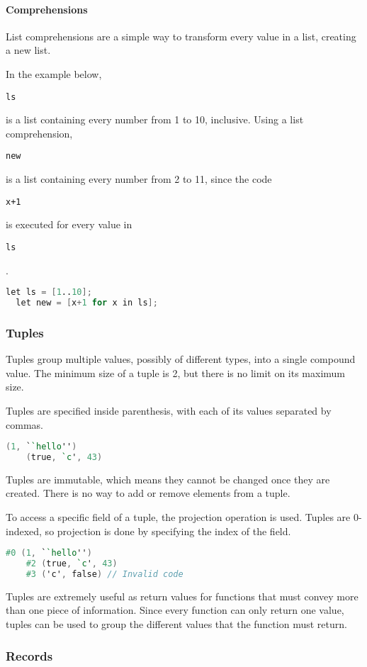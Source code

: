 \documentclass{article}
\def\code#1{\begin{footnotesize}\texttt{#1}\end{footnotesize}}
\begin{document}
\paragraph{Comprehensions}
List comprehensions are a simple way to transform every value in a list, creating a new list.

In the example below, \code{ls} is a list containing every number from 1 to 10, inclusive.
Using a list comprehension, \code{new} is a list containing every number from 2 to 11, since the code \code{x+1} is executed for every value in \code{ls}.

\begin{lstlisting}[language=V]
  let ls = [1..10];
  let new = [x+1 for x in ls];
\end{lstlisting}



\subsubsection{Tuples}

Tuples group multiple values, possibly of different types, into a single compound value.
The minimum size of a tuple is 2, but there is no limit on its maximum size.

Tuples are specified inside parenthesis, with each of its values separated by commas.

\begin{lstlisting}[language=V]
    (1, ``hello'')
    (true, `c', 43)
\end{lstlisting}

Tuples are immutable, which means they cannot be changed once they are created.
There is no way to add or remove elements from a tuple.

To access a specific field of a tuple, the projection operation is used.
Tuples are 0-indexed, so projection is done by specifying the index of the field.

\begin{lstlisting}[language=V]
    #0 (1, ``hello'')
    #2 (true, `c', 43)
    #3 ('c', false) // Invalid code
\end{lstlisting}

Tuples are extremely useful as return values for functions that must convey more than one piece of information.
Since every function can only return one value, tuples can be used to group the different values that the function must return.

\subsubsection{Records}
\end{document}
